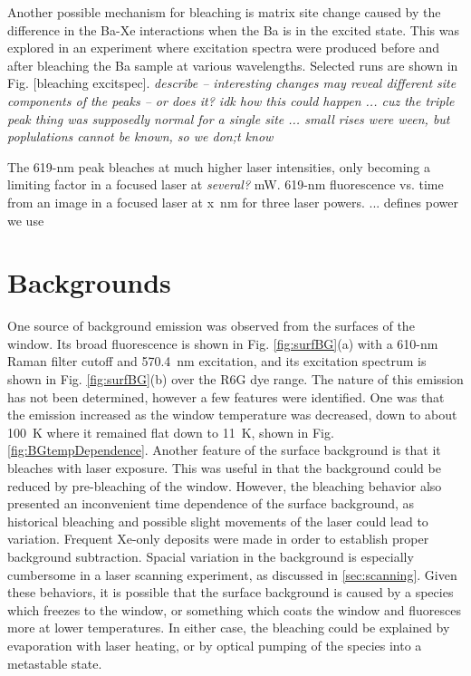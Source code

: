 Another possible mechanism for bleaching is matrix site change caused by the difference in the Ba-Xe interactions when the Ba is in the excited state.  This was explored in an experiment where excitation spectra were produced before and after bleaching the Ba sample at various wavelengths.  Selected runs are shown in Fig. [bleaching excitspec].  \emph{\color{gray}describe -- interesting changes may reveal different site components of the peaks -- or does it?  idk how this could happen ... cuz the triple peak thing was supposedly normal for a single site ... small rises were ween, but poplulations cannot be known, so we don;t know}

The 619-nm peak bleaches at much higher laser intensities, only becoming a limiting factor in a focused laser at \emph{\color{red}several?} mW.  619-nm fluorescence vs. time from an image in a focused laser at x~nm for three laser powers.  ... defines power we use

\section{Backgrounds}
\label{sec:bgs}

One source of background emission was observed from the surfaces of the window.  Its broad fluorescence is shown in Fig. \ref{fig:surfBG}(a) with a 610-nm Raman filter cutoff and 570.4~nm excitation, and its excitation spectrum is shown in Fig. \ref{fig:surfBG}(b) over the R6G dye range.  The nature of this emission has not been determined, however a few features were identified.  One was that the emission increased as the window temperature was decreased, down to about 100~K where it remained flat down to 11~K, shown in Fig. \ref{fig:BGtempDependence}.  Another feature of the surface background is that it bleaches with laser exposure.  This was useful in that the background could be reduced by pre-bleaching of the window.  However, the bleaching behavior also presented an inconvenient time dependence of the surface background, as historical bleaching and possible slight movements of the laser could lead to variation.  Frequent Xe-only deposits were made in order to establish proper background subtraction.  Spacial variation in the background is especially cumbersome in a laser scanning experiment, as discussed in \ref{sec:scanning}.  Given these behaviors, it is possible that the surface background is caused by a species which freezes to the window, or something which coats the window and fluoresces more at lower temperatures.  In either case, the bleaching could be explained by evaporation with laser heating, or by optical pumping of the species into a metastable state.

